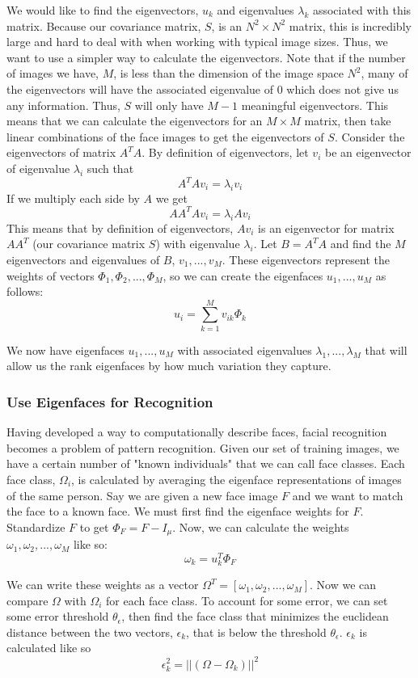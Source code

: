 \documentclass{article}
\begin{document}
\noindent We would like to find the eigenvectors, $u_k$ and eigenvalues $\lambda_k$ associated with this matrix. Because our covariance matrix, $S$, is an $N^2 \times N^2$ matrix, this is incredibly large and hard to deal with when working with typical image sizes. Thus, we want to use a simpler way to calculate the eigenvectors. Note that if the number of images we have, $M$, is less than the dimension of the image space $N^2$, many of the eigenvectors will have the associated eigenvalue of 0 which does not give us any information. Thus, $S$ will only have $M-1$ meaningful eigenvectors. This means that we can calculate the eigenvectors for an $M \times M$ matrix, then take linear combinations of the face images to get the eigenvectors of $S$. Consider the eigenvectors of matrix $A^TA$. By definition of eigenvectors, let $v_i$ be an eigenvector of eigenvalue $\lambda_i$ such that 
$$A^TAv_i = \lambda_iv_i$$
\noindent If we multiply each side by $A$ we get 
$$AA^TAv_i = \lambda_iAv_i$$
\noindent This means that by definition of eigenvectors, $Av_i$ is an eigenvector for matrix $AA^T$ (our covariance matrix $S$) with eigenvalue $\lambda_i$. Let $B = A^TA$ and find the $M$ eigenvectors and eigenvalues of $B$, $v_1,...,v_M$. These eigenvectors represent the weights of vectors $\Phi_1, \Phi_2,..., \Phi_M$, so we can create the eigenfaces $u_1,...,u_M$ as follows:
$$u_i = \sum_{k=1}^{M}v_{ik}\Phi_k$$

\noindent We now have eigenfaces $u_1,...,u_M$ with associated eigenvalues $\lambda_1,...,\lambda_M$ that will allow us the rank eigenfaces by how much variation they capture.

\subsubsection{Use Eigenfaces for Recognition}
Having developed a way to computationally describe faces, facial recognition becomes a problem of pattern recognition. Given our set of training images, we have a certain number of "known individuals" that we can call face classes. Each face class, $\Omega_i$, is calculated by averaging the eigenface representations of images of the same person. Say we are given a new face image $F$ and we want to match the face to a known face. We must first find the eigenface weights for $F$. Standardize $F$ to get $\Phi_F = F - I_\mu$. Now, we can calculate the weights $\omega_1, \omega_2, ..., \omega_M$ like so:
$$\omega_k = u_k^T\Phi_F$$

\noindent We can write these weights as a vector $\Omega^T = [\omega_1, \omega_2, ..., \omega_M]$. Now we can compare $\Omega$ with $\Omega_i$ for each face class. To account for some error, we can set some error threshold $\theta_\epsilon$, then find the face class that minimizes the euclidean distance between the two vectors, $\epsilon_k$, that is below the threshold $\theta_\epsilon$. $\epsilon_k$ is calculated like so
$$\epsilon_k^2 = ||(\Omega - \Omega_k)||^2$$
\end{document}
